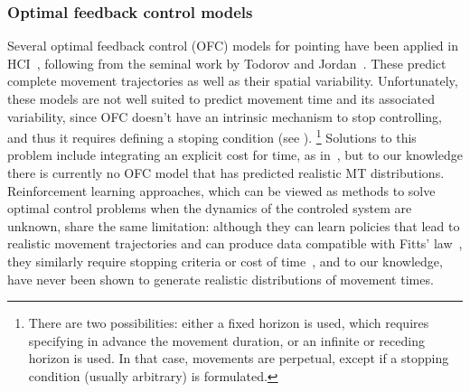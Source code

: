 \documentclass[acmlarge, manuscript,review]{acmart}
\begin{document}
\subsubsection{Optimal feedback control models}
Several optimal feedback control (OFC) models for pointing have been applied in HCI~\cite{klar2023,fischer2022}, following from the seminal work by Todorov and Jordan~\cite{todorov2002}. These predict complete movement trajectories as well as their spatial variability.
Unfortunately, these models are not well suited to predict movement time and its associated variability, since OFC doesn't have an intrinsic mechanism to stop controlling, and thus it requires defining a stoping condition (see \eg \cite[Section 3.4]{qian2013}). \footnote{There are two possibilities: either a fixed horizon is used, which requires specifying in advance the movement duration, or an infinite or receding horizon is used. In that case, movements are perpetual, except if a stopping condition (usually arbitrary) is formulated.}
Solutions to this problem include integrating an explicit cost for time, as in~\cite{berret2016}, but to our knowledge there is currently no OFC model that has predicted realistic MT distributions.
Reinforcement learning approaches, which can be viewed as methods to solve optimal control problems when the dynamics of the controled system are unknown, share the same limitation: although they can learn policies that lead to realistic movement trajectories and can produce data compatible with Fitts' law~\cite{ikkala2022, charaja2024}, they similarly require stopping criteria or cost of time~\cite{fischer2022}, and to our knowledge, have never been shown to generate realistic distributions of movement times.
\end{document}
